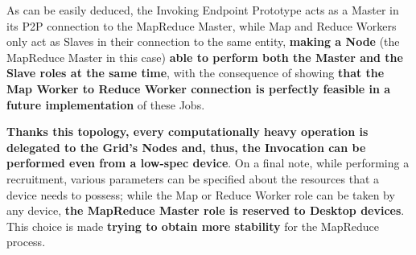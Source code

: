 As can be easily deduced, the Invoking Endpoint Prototype acts as a Master in its P2P connection to the MapReduce Master, while Map and Reduce Workers only act as Slaves in their connection to the same entity, \textbf{making a Node} (the MapReduce Master in this case) \textbf{able to perform both the Master and the Slave roles at the same time}, with the consequence of showing \textbf{that the Map Worker to Reduce Worker connection is perfectly feasible in a future implementation} of these Jobs.

\textbf{Thanks this topology, every computationally heavy operation is delegated to the Grid's Nodes and, thus, the Invocation can be performed even from a low-spec device}. On a final note, while performing a recruitment, various parameters can be specified about the resources that a device needs to possess; while the Map or Reduce Worker role can be taken by any device, \textbf{the MapReduce Master role is reserved to Desktop devices}. This choice is made \textbf{trying to obtain more stability} for the MapReduce process.  